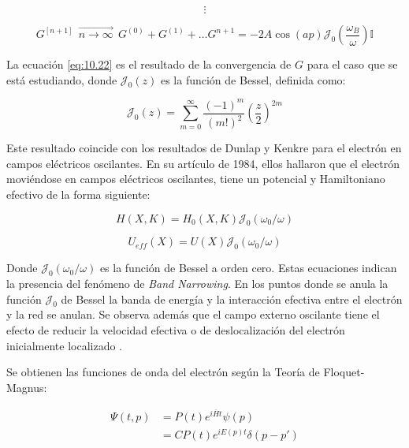 \begin{equation*}
    \vdots
\end{equation*}

\begin{equation}\label{eq:10.22}
    G^{[n+1]} \ \ \overrightarrow{n \rightarrow \infty} \ \
 G^{(0)}+G^{(1)}+\dots G^{n+1}=-2A\cos(a p)\mathcal{J}_0(\frac{\omega_B}{\omega})\mathbb{I}
\end{equation}

La ecuación \ref{eq:10.22} es el resultado de la convergencia de $G$ para el caso que se está estudiando, donde $\mathcal{J}_0(z)$ es la función de Bessel, definida como:

\begin{equation}\label{eq:10.23}
    \mathcal{J}_0(z)=\sum^{\infty}_{m=0}\frac{(-1)^m}{(m!)^2}(\frac{z}{2})^{2m}
\end{equation}

Este resultado coincide con los resultados de Dunlap y Kenkre \cite{Dunlap} para el electrón en campos eléctricos oscilantes. En su artículo de 1984, ellos hallaron que el electrón moviéndose en campos eléctricos oscilantes, tiene un potencial y Hamiltoniano efectivo de la forma siguiente:

\begin{equation}
    H(X,K)=H_0(X,K)\mathcal{J}_0(\omega_0/\omega)
\end{equation}

\begin{equation}
U_{eff}(X)=U(X)\mathcal{J}_0(\omega_0/\omega)    
\end{equation}

Donde $\mathcal{J}_0(\omega_0/\omega)$ es la función de Bessel a orden cero. Estas ecuaciones indican la presencia del fenómeno de \textit{Band Narrowing}. En los puntos donde se anula la función $\mathcal{J}_0$ de Bessel la banda de energía y la interacción efectiva entre el electrón y la red se anulan. Se observa además que el campo externo oscilante tiene el efecto de reducir la velocidad efectiva o de deslocalización del electrón inicialmente localizado \cite{Dunlap}.

 Se obtienen las funciones de onda del electrón según la Teoría de Floquet-Magnus:

\begin{equation}\label{eq:10.24}
\begin{split}
    \Psi(t,p)&=P(t)e^{i\overline{H}t}\psi(p)
    \\&=CP(t)e^{iE(p)t}\delta(p-p')
\end{split}
\end{equation}

